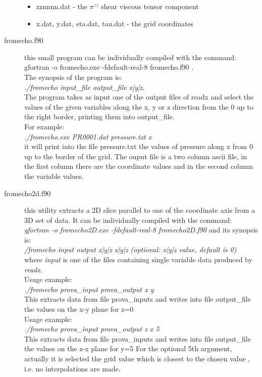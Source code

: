 \begin{description}
\begin{itemize}
\item zznnnn.dat - the $\pi^{zz}$ shear viscous tensor component
\item x.dat, y.dat, eta.dat, tau.dat - the grid coordinates
\end{itemize}
\item [fromecho.f90] this small program can be individually compiled with the command: gfortran -o fromecho.exe -fdefault-real-8 fromecho.f90 .\\
      The synopsis of the program is:\\
      \textit{./fromecho input\_file output\_file x|y|z}.\\
      The program takes as input one of the output files of readx and select the values of the given variables along the x, y or z direction from the 0 up to the right border, printing them into output\_file.\\
      For example:\\
      \textit{./fromecho.exe PR0001.dat pressure.txt x}\\
       it will print into the file pressure.txt the values of pressure along x from 0 up to the border of the grid.
The ouput file is a two column ascii file, in the first column there are the coordinate values and in the second column the variable values.
\item [fromecho2d.f90] this utility extracts a 2D slice parallel to one of the coordinate axis from a 3D set of data. It can be individually compiled with the command: \emph{gfortran -o fromecho2D.exe -fdefault-real-8 fromecho2D.f90} and its synopsis is:\\
 \textit{/fromecho input output x|y|z x|y|z (optional: x|y|z value, default is 0)}\\
where \emph{input} is one of the files containing single variable data produced by \emph{readx}.\\
Usage example:\\
 \emph{./fromecho prova\_input prova\_output x y}\\
 This extracts data from file prova\_inputs and writes into file output\_file the values on the x-y plane for z=0\\
 Usage example:\\
 \emph{./fromecho prova\_input prova\_output z x 5}\\
 This extracts data from file prova\_inputs and writes into file output\_file the values on the z-x plane for y=5
 For the optional 5th argument, actually it is selected the grid value which is closest to the chosen value
 , i.e. no interpolations are made.\\


\end{description}
